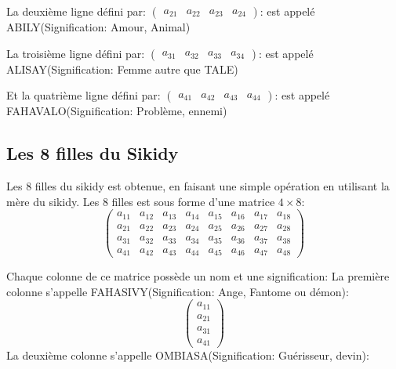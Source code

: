 \documentclass[12pt]{report}
\begin{document}
La deuxième ligne défini par:\newline
$ \begin{pmatrix}
a_{21} & a_{22} & a_{23} & a_{24}
\end{pmatrix} $: est appelé ABILY(Signification: Amour, Animal)\newline

La troisième ligne défini par:\newline
$ \begin{pmatrix}
a_{31} & a_{32} & a_{33} & a_{34}
\end{pmatrix} $: est appelé ALISAY(Signification: Femme autre que TALE)\newline

Et la quatrième ligne défini par:\newline
$ \begin{pmatrix}
a_{41} & a_{42} & a_{43} & a_{44}
\end{pmatrix} $: est appelé FAHAVALO(Signification: Problème, ennemi)\newline

\subsection{Les 8 filles du Sikidy}

Les 8 filles du sikidy est obtenue, en faisant une simple opération en utilisant la mère du sikidy. Les 8 filles est sous forme d'une matrice $ 4 \times 8 $:
\[
\begin{pmatrix}
a_{11} & a_{12} & a_{13} & a_{14} & a_{15} & a_{16} & a_{17} & a_{18} \\
a_{21} & a_{22} & a_{23} & a_{24} & a_{25} & a_{26} & a_{27} & a_{28} \\
a_{31} & a_{32} & a_{33} & a_{34} & a_{35} & a_{36} & a_{37} & a_{38} \\
a_{41} & a_{42} & a_{43} & a_{44} & a_{45} & a_{46} & a_{47} & a_{48} 
\end{pmatrix}
\]

Chaque colonne de ce matrice possède un nom et une signification:\newline
La première colonne s'appelle FAHASIVY(Signification: Ange, Fantome ou démon):
\[
\begin{pmatrix}
a_{11}\\
a_{21}\\
a_{31}\\
a_{41}
\end{pmatrix}
\] 
La deuxième colonne s'appelle OMBIASA(Signification: Guérisseur, devin):
\end{document}
